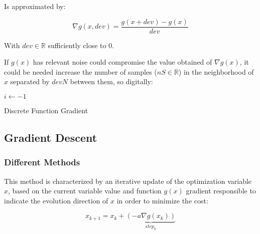 Is approximated by:

\begin{equation}
    \nabla g(x, dev) = \frac{g(x + dev) - g(x)}{dev}
    \label{eq:Gradient_Discretization}
\end{equation}

With \(dev \in \mathbb{R}\) sufficiently close to \(0\). \par

If \(g(x)\) has relevant noise could compromise the value obtained of \(\nabla g(x)\), it could be needed increase the number of samples (\(nS \in \mathbb{R}\)) in the neighborhood of \(x\) separated by \(devN\) between them, so digitally:
  \begin{algorithm}
    $i\gets -1$\;
    \caption{Discrete Function Gradient } \label{alg:Discrete_Function_Gradient}
  \end{algorithm}



\subsection{Gradient Descent}
\label{subsec:Gradient_Descent}

\subsubsection{Different Methods}
\label{subsubsec:Different_Methods}

This method is characterized by an iterative update of the optimization variable \(x\), based on the current variable value and function \(g(x)\) gradient responsible to indicate the evolution direction of \(x\) in order to minimize the cost:

\begin{equation}
    x_{k+1} = x_k + \underbrace{(- a \nabla g(x_k))}_{step_{k}}
    \label{eq:Gradient_Descent_Normal}
\end{equation}

